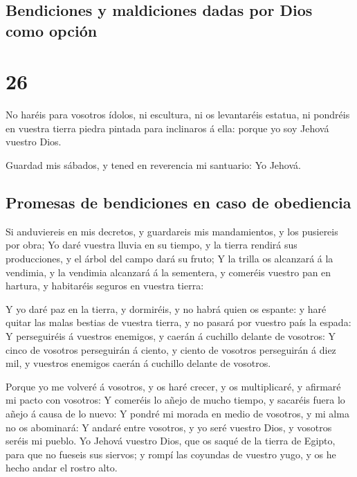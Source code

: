 \hypertarget{bendiciones-y-maldiciones-dadas-por-dios-como-opciuxf3n}{%
\subsection{Bendiciones y maldiciones dadas por Dios como
opción}\label{bendiciones-y-maldiciones-dadas-por-dios-como-opciuxf3n}}

\hypertarget{section-25}{%
\section{26}\label{section-25}}

 No haréis para vosotros ídolos, ni escultura, ni os
levantaréis estatua, ni pondréis en vuestra tierra piedra pintada para
inclinaros á ella: porque yo soy Jehová vuestro Dios.

 Guardad mis sábados, y tened en reverencia mi santuario:
Yo Jehová.

\hypertarget{promesas-de-bendiciones-en-caso-de-obediencia}{%
\subsection{Promesas de bendiciones en caso de
obediencia}\label{promesas-de-bendiciones-en-caso-de-obediencia}}

 Si anduviereis en mis decretos, y guardareis mis
mandamientos, y los pusiereis por obra;  Yo daré vuestra
lluvia en su tiempo, y la tierra rendirá sus producciones, y el árbol
del campo dará su fruto;  Y la trilla os alcanzará á la
vendimia, y la vendimia alcanzará á la sementera, y comeréis vuestro pan
en hartura, y habitaréis seguros en vuestra tierra:

 Y yo daré paz en la tierra, y dormiréis, y no habrá quien
os espante: y haré quitar las malas bestias de vuestra tierra, y no
pasará por vuestro país la espada:  Y perseguiréis á
vuestros enemigos, y caerán á cuchillo delante de vosotros:
 Y cinco de vosotros perseguirán á ciento, y ciento de
vosotros perseguirán á diez mil, y vuestros enemigos caerán á cuchillo
delante de vosotros.

 Porque yo me volveré á vosotros, y os haré crecer, y os
multiplicaré, y afirmaré mi pacto con vosotros:  Y
comeréis lo añejo de mucho tiempo, y sacaréis fuera lo añejo á causa de
lo nuevo:  Y pondré mi morada en medio de vosotros, y mi
alma no os abominará:  Y andaré entre vosotros, y yo seré
vuestro Dios, y vosotros seréis mi pueblo.  Yo Jehová
vuestro Dios, que os saqué de la tierra de Egipto, para que no fueseis
sus siervos; y rompí las coyundas de vuestro yugo, y os he hecho andar
el rostro alto.

